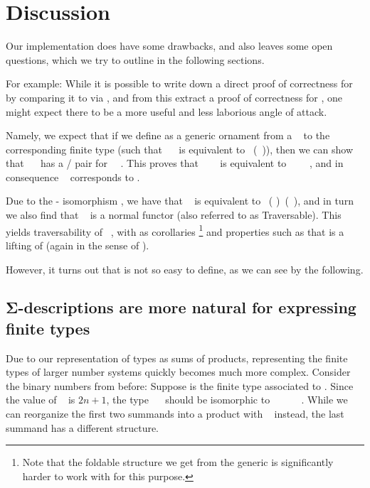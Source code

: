 \section{Discussion}
Our implementation does have some drawbacks, and also leaves some open questions, which we try to outline in the following sections.

For example: While it is possible to write down a direct proof of correctness for  by comparing it to  via , and from this extract a proof of correctness for , one might expect there to be a more useful and less laborious angle of attack. 

Namely, we expect that if we define  as a generic ornament from a \  to the corresponding finite type (such that \ \  is equivalent to \ (\ )), then we can show that \ \  has a / pair for \ \ . This proves that \ \ \  is equivalent to \ \ \ \ , and in consequence \  corresponds to .

Due to the - isomorphism \cite{algorn}, we have that \  is equivalent to \ ( )\ (\ ), and in turn we also find that \  is a normal functor (also referred to as Traversable). This yields traversability of \ , with as corollaries \footnote{Note that the foldable structure we get from the generic  is significantly harder to work with for this purpose.} and properties such as that  is a lifting of  (again in the sense of \cite{orntrans}).

However, it turns out that  is not so easy to define, as we can see by the following.

\subsection{Σ-descriptions are more natural for expressing finite types}\label{sec:sigma-desc}
Due to our representation of types as sums of products, representing the finite types of larger number systems quickly becomes much more complex. Consider the binary numbers from before:
Suppose  is the finite type associated to . Since the value of \  is $2n + 1$, the type \ \AV{(}\  should be isomorphic to \ \  \ \ \ . While we can reorganize the first two summands into a product with \  instead, the last summand has a different structure.

